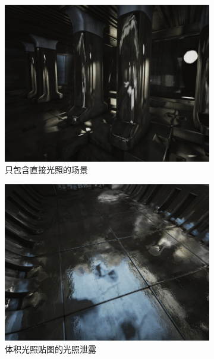 \begin{figure}
\begin{fullwidth}
	\begin{subfigure}[b]{0.33\thewidth}
		\includegraphics[width=\textwidth]{figures/pl/reflection-1}
		\caption{只包含直接光照的场景}
	\end{subfigure}
	\begin{subfigure}[b]{0.33\thewidth}
		\includegraphics[width=\textwidth]{figures/pl/reflection-2}
			\caption{体积光照贴图的光照泄露}
	\end{subfigure}
	\begin{subfigure}[b]{0.33\thewidth}

\end{subfigure}
\end{fullwidth}
\end{figure}
